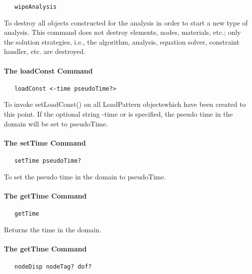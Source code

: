 \documentclass[12pt]{article}
\begin{document}
{\sf\small
\begin{verbatim}
   wipeAnalysis
\end{verbatim}
}

\noindent To destroy all objects constructed for the analysis in order
to start a new type of analysis. This command does not destroy elements,
nodes, materials, etc.; only the solution strategies, i.e., the algorithm,
analysis, equation solver, constraint handler, etc. are destroyed.

\paragraph {The loadConst Command}

{\sf\small
\begin{verbatim}
   loadConst <-time pseudoTime?>
\end{verbatim}
}

\noindent To invoke setLoadConst() on all LoadPattern objectswhich
have been created to this point. If the optional string -time or
is specified, the pseudo time in the domain will be set to pseudoTime.

\paragraph {The setTime Command}

{\sf\small
\begin{verbatim}
   setTime pseudoTime?
\end{verbatim}
}

\noindent To set the pseudo time in the domain to pseudoTime.

\paragraph {The getTime Command}

{\sf\small
\begin{verbatim}
   getTime
\end{verbatim}
}

\noindent Returns the time in the domain.

\paragraph {The getTime Command}

{\sf\small
\begin{verbatim}
   nodeDisp nodeTag? dof?
\end{verbatim}
}
\end{document}
